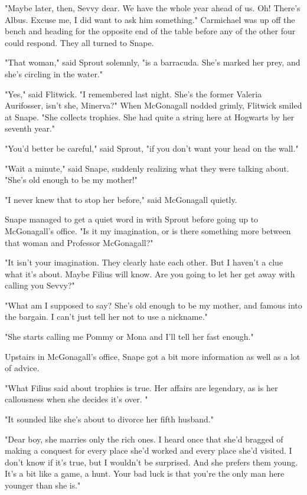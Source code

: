 "Maybe later, then, Sevvy dear. We have the whole year ahead of us. Oh! There's Albus. Excuse me, I did want to ask him something." Carmichael was up off the bench and heading for the opposite end of the table before any of the other four could respond. They all turned to Snape.

"That woman," said Sprout solemnly, "is a barracuda. She's marked her prey, and she's circling in the water."

"Yes," said Flitwick. "I remembered last night. She's the former Valeria Aurifosser, isn't she, Minerva?" When McGonagall nodded grimly, Flitwick smiled at Snape. "She collects trophies. She had quite a string here at Hogwarts by her seventh year."

"You'd better be careful," said Sprout, "if you don't want your head on the wall."

"Wait a minute," said Snape, suddenly realizing what they were talking about. "She's old enough to be my mother!"

"I never knew that to stop her before," said McGonagall quietly.

Snape managed to get a quiet word in with Sprout before going up to McGonagall's office. "Is it my imagination, or is there something more between that woman and Professor McGonagall?"

"It isn't your imagination. They clearly hate each other. But I haven't a clue what it's about. Maybe Filius will know. Are you going to let her get away with calling you Sevvy?"

"What am I supposed to say? She's old enough to be my mother, and famous into the bargain. I can't just tell her not to use a nickname."

"She starts calling me Pommy or Mona and I'll tell her fast enough."

Upstairs in McGonagall's office, Snape got a bit more information as well as a lot of advice.

"What Filius said about trophies is true. Her affairs are legendary, as is her callousness when she decides it's over. "

"It sounded like she's about to divorce her fifth husband."

"Dear boy, she marries only the rich ones. I heard once that she'd bragged of making a conquest for every place she'd worked and every place she'd visited. I don't know if it's true, but I wouldn't be surprised. And she prefers them young. It's a bit like a game, a hunt. Your bad luck is that you're the only man here younger than she is."

